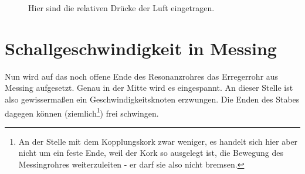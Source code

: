 \begin{figure}
	\centering


	\caption{Hier sind die relativen Drücke der Luft eingetragen.}\label{p}
\end{figure}


\clearpage



		\section{Schallgeschwindigkeit in Messing}

Nun wird auf das noch offene Ende des Resonanzrohres das Erregerrohr aus Messing aufgesetzt. Genau in der Mitte wird es eingespannt. An dieser Stelle ist also gewissermaßen ein Geschwindigkeitsknoten erzwungen. Die Enden des Stabes dagegen können (ziemlich\footnote{An der Stelle mit dem Kopplungskork zwar weniger, es handelt sich hier aber nicht um ein feste Ende, weil der Kork so ausgelegt ist, die Bewegung des Messingrohres weiterzuleiten - er darf sie also nicht bremsen.}) frei schwingen. 

